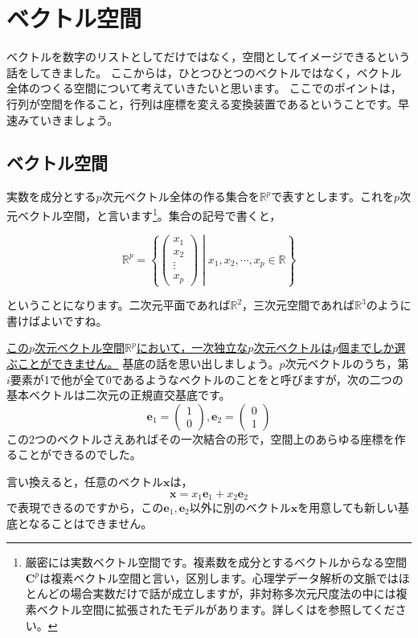 \documentclass{ltjsbook}
\begin{document}
\chapter{ベクトル空間}
\label{L05_Basis}
ベクトルを数字のリストとしてだけではなく，空間としてイメージできるという話をしてきました。
ここからは，ひとつひとつのベクトルではなく，ベクトル全体のつくる空間について考えていきたいと思います。
ここでのポイントは，行列が空間を作ること，行列は座標を変える変換装置であるということです。早速みていきましょう。

\section{ベクトル空間}
実数を成分とする$p$次元ベクトル全体の作る集合を$\mathbb{R}^p$で表すとします。これを$p$次元ベクトル空間，と言います\footnote{厳密には実数ベクトル空間です。複素数を成分とするベクトルからなる空間$\bm{C}^p$は複素ベクトル空間と言い，区別します。心理学データ解析の文脈ではほとんどの場合実数だけで話が成立しますが，非対称多次元尺度法の中には複素ベクトル空間に拡張されたモデルがあります。詳しくは\textcite{Chino2012}を参照してください。}。集合の記号で書くと，

\[ \mathbb{R}^p = \left \{ \begin{pmatrix} x_1 \\ x_2 \\ \vdots \\ x_p \end{pmatrix} \middle| x_1,x_2,\cdots,x_p \in \mathbb{R} \right \} \]

ということになります。二次元平面であれば$\mathbb{R}^2$，三次元空間であれば$\mathbb{R}^3$のように書けばよいですね。

\underline{この$p$次元ベクトル空間$\mathbb{R}^p$において，一次独立な$p$次元ベクトルは$p$個までしか選ぶことができません。}
基底の話を思い出しましょう。$p$次元ベクトルのうち，第$i$要素が1で他が全て0であるようなベクトルのことをと呼びますが，次の二つの基本ベクトルは二次元の正規直交基底です。
\[ \bm{e}_1 = \begin{pmatrix}1\\0\end{pmatrix},\bm{e}_2 = \begin{pmatrix}0 \\ 1 \end{pmatrix}\]
この2つのベクトルさえあればその一次結合の形で，空間上のあらゆる座標を作ることができるのでした。

言い換えると，任意のベクトル$\bm{x}$は，
\[ \bm{x} = x_1 \bm{e}_1 + x_2 \bm{e}_2 \]
で表現できるのですから，この$\bm{e}_1,\bm{e}_2$以外に別のベクトル$\bm{x}$を用意しても新しい基底となることはできません。
\end{document}

